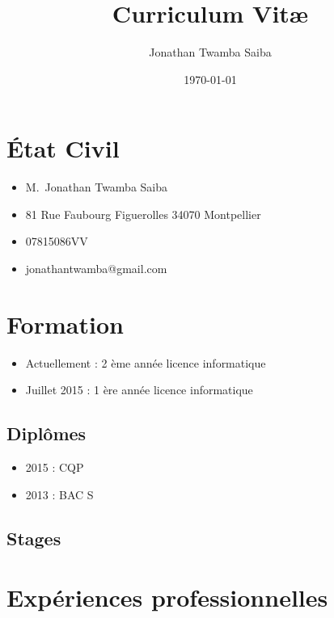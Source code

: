 \documentclass[a4paper]{article}
\title{Curriculum Vit\ae}
\author{Jonathan Twamba Saiba}
\date{\today}
\begin{document}
\maketitle

\section{\'Etat Civil}
\begin{itemize}
\item M.~Jonathan Twamba Saiba
\item 81  Rue Faubourg Figuerolles 34070 Montpellier
\item 07815086VV
\item jonathantwamba@gmail.com
\end{itemize}

\section{Formation}
\begin{itemize}
\item Actuellement : 2 ème année licence informatique
\item Juillet 2015 : 1 ère année licence informatique
\end{itemize}

\subsection{Diplômes}
\begin{itemize}
\item 2015 : CQP
\item 2013 : BAC S 
\end{itemize}

\subsection{Stages}

\section{Expériences professionnelles}
\begin{itemize}

\end{itemize}
\end{document}
